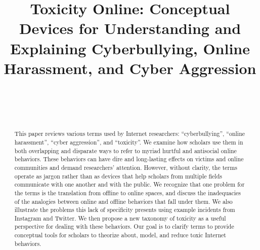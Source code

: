 \documentclass{sigchi}
\def\plaintitle{Toxicity Online: Conceptual Devices for Understanding and Explaining Cyberbullying, Online Harassment, and Cyber Aggression}
\begin{document}
\title{\plaintitle}

\author{%
  \\
  \\
  \\
}

\maketitle

\begin{abstract}
	This paper reviews various terms used by Internet researchers: ``cyberbullying'', ``online harassment'', ``cyber aggression'', and ``toxicity''. We examine how scholars use them in both overlapping and disparate ways to refer to myriad hurtful and antisocial online behaviors. These behaviors can have dire and long-lasting effects on victims and online communities and demand researchers' attention. However, without clarity, the terms operate as jargon rather than as devices that help scholars from multiple fields communicate with one another and with the public. We recognize that one problem for the terms is the translation from offline to online spaces, and discuss the inadequacies of the analogies between online and offline behaviors that fall under them. We also illustrate the problems this lack of specificity presents using example incidents from Instagram and Twitter. We then propose a new taxonomy of toxicity as a useful perspective for dealing with these behaviors. Our goal is to clarify terms to provide conceptual tools for scholars to theorize about, model, and reduce toxic Internet behaviors.
\end{abstract}

 
\end{document}
